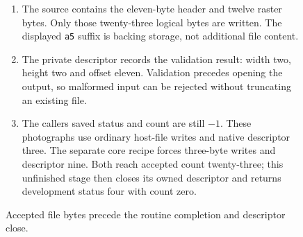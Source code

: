 \begin{figure}[htbp]
\begin{minipage}{\linewidth}
\begin{enumerate}
      \item The source contains the eleven-byte header and twelve raster bytes. Only those twenty-three logical bytes are written. The displayed \texttt{a5} suffix is backing storage, not additional file content.
      \item The private descriptor records the validation result: width two, height two and offset eleven. Validation precedes opening the output, so malformed input can be rejected without truncating an existing file.
      \item The caller\textquotesingle s saved status and count are still $-1$. These photographs use ordinary host-file writes and native descriptor three. The separate core recipe forces three-byte writes and descriptor nine. Both reach accepted count twenty-three; this unfinished stage then closes its owned descriptor and returns development status four with count zero.
    \end{enumerate}
  \end{minipage}
  \caption{Accepted file bytes precede the routine completion and descriptor close.}
  \label{capture:029-binary-ppm-f04}
  \label{ppm-f04}
\end{figure}
\par
